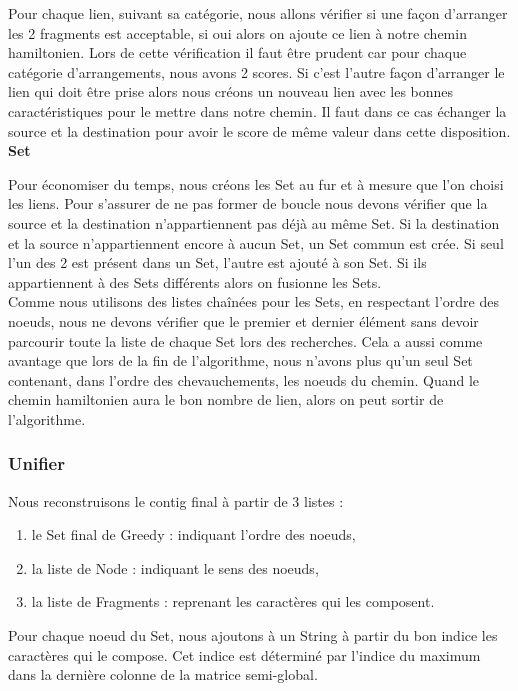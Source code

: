 \documentclass{article}
\begin{document}
\vspace{0.3mm}
Pour chaque lien, suivant sa catégorie, nous allons vérifier si une façon d'arranger les 2 fragments est acceptable, si oui alors on ajoute ce lien à notre chemin hamiltonien.
Lors de cette vérification il faut être prudent car pour chaque catégorie d'arrangements, nous avons 2 scores. Si c'est l'autre façon d'arranger le lien qui doit être prise alors nous créons un nouveau lien avec les bonnes caractéristiques pour le mettre dans notre chemin. Il faut dans ce cas échanger la source et la destination pour avoir le score de même valeur dans cette disposition.\\

\textbf{Set}

\vspace{0.3mm}
Pour économiser du temps, nous créons les Set au fur et à mesure que l'on choisi les liens. Pour s'assurer de ne pas former de boucle nous devons vérifier que la source et la destination n'appartiennent pas déjà au même Set. Si la destination et la source n'appartiennent encore à aucun Set, un Set commun est crée. Si seul l'un des 2 est présent dans un Set, l'autre est ajouté à son Set. Si ils appartiennent à des Sets différents alors on fusionne les Sets. \\

Comme nous utilisons des listes chaînées pour les Sets, en respectant l'ordre des noeuds, nous ne devons vérifier que le premier et dernier élément sans devoir parcourir toute la liste de chaque Set lors des recherches. Cela a aussi comme avantage que lors de la fin de l'algorithme, nous n'avons plus qu'un seul Set contenant, dans l'ordre des chevauchements, les noeuds du chemin.
Quand le chemin hamiltonien aura le bon nombre de lien, alors on peut sortir de l'algorithme.

\subsubsection{Unifier} 
Nous reconstruisons le contig final à partir de 3 listes :
\begin{enumerate}
\item le Set final de Greedy : indiquant l'ordre des noeuds,
\item la liste de Node : indiquant le sens des noeuds,
\item la liste de Fragments : reprenant les caractères qui les composent.
\end{enumerate} 
Pour chaque noeud du Set, nous ajoutons à un String à partir du bon indice les caractères qui le compose. Cet indice est déterminé par l'indice du maximum dans la dernière colonne de la matrice semi-global.\\
\end{document}
